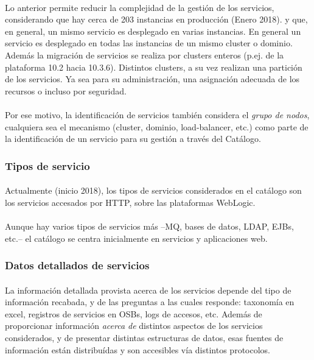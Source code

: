 \paragraph{}
Lo anterior permite reducir la complejidad de la gesti\'on de los servicios,
considerando que hay cerca de 203 instancias en producci\'on (Enero 2018).
y que, en general, un mismo servicio es desplegado en varias instancias.
%
En general un servicio es desplegado en todas las instancias de un mismo 
cluster o dominio.
Adem\'as la migraci\'on de servicios se realiza por clusters enteros
(p.ej. de la plataforma 10.2 hacia 10.3.6).
%
Distintos clusters, a su vez realizan una partici\'on de los servicios.
Ya sea para su administraci\'on, una asignaci\'on adecuada de los recursos
o incluso por seguridad.

\paragraph{}
Por ese motivo, la identificaci\'on de servicios tambi\'en considera
el \emph{grupo de nodos},
cualquiera sea el mecanismo (cluster, dominio, load-balancer, etc.)
como parte de la identificaci\'on de un servicio para su gesti\'on
a trav\'es del Cat\'alogo.


\subsubsection{Tipos de servicio}
\paragraph{}
Actualmente (inicio 2018),
los tipos de servicios considerados en el cat\'alogo son los servicios accesados
por HTTP, sobre las plataformas WebLogic.

\paragraph{}
Aunque hay varios tipos de servicios m\'as --MQ, bases de datos, LDAP, EJBs, etc.--
el cat\'alogo se centra inicialmente en servicios y aplicaciones web.


\subsubsection{Datos detallados de servicios}
\paragraph{}
La informaci\'on detallada provista acerca de los servicios depende del tipo 
de informaci\'on recabada, y de las preguntas a las cuales responde:
taxonom\'ia en excel, registros de servicios en OSBs, logs de accesos, etc.
%
Adem\'as de proporcionar informaci\'on \emph{acerca de} distintos aspectos
de los servicios considerados, y de presentar distintas estructuras de datos,
esas fuentes de informaci\'on est\'an distribu\'idas y son accesibles v\'ia distintos
protocolos.

